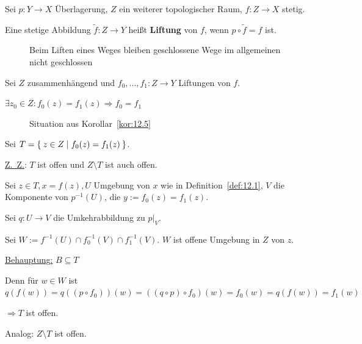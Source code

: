 \begin{definition}
    Sei $p: Y \rightarrow X$ Überlagerung, $Z$ ein weiterer topologischer
    Raum, $f:Z \rightarrow X$ stetig.

    Eine stetige Abbildung $\tilde{f}: Z \rightarrow Y$ heißt
    \textbf{Liftung} von $f$, wenn $p \circ \tilde{f} = f$ ist.
\end{definition}

\begin{figure}
    \centering
    
    \caption{Beim Liften eines Weges bleiben geschlossene Wege im allgemeinen nicht geschlossen}
    \label{fig:satz-seifert-van-kampen}
\end{figure}

\begin{korollar}\label{kor:12.5}%
    Sei $Z$ zusammenhängend und $f_0, \dots, f_1: Z \rightarrow Y$
    Liftungen von $f$.

    $\exists z_0 \in Z: f_0(z) = f_1(z) \Rightarrow f_0 = f_1$
\end{korollar}

\begin{figure}
    \centering
    
    \caption{Situation aus Korollar~\ref{kor:12.5}}
    \label{fig:situation-kor-12.5}
\end{figure}

\begin{beweis}
    Sei $T = \Set{z \in Z | f_0(z) = f_1(z)}$.

    \underline{Z.~Z.}: $T$ ist offen und $Z \setminus T$ ist auch offen.

    Sei $z \in T, x = f(z), U$ Umgebung von $x$ wie in Definition~\ref{def:12.1},
    $V$ die Komponente von $p^{-1}(U)$, die $y:=f_0(z) = f_1(z)$.

    Sei $q:U \rightarrow V$ die Umkehrabbildung zu $p|_V$.

    Sei $W:= f^{-1}(U) \cap f_0^{-1}(V) \cap f_1^{-1}(V)$. $W$ ist 
    offene Umgebung in $Z$ von $z$.

    \underline{Behauptung:} $B \subseteq T$

    Denn für $w \in W$ ist $q(f(w)) = q((p \circ f_0))(w) = ((q \circ p) \circ f_0) (w) = f_0(w) = q(f(w)) = f_1(w)$

    $\Rightarrow T$ ist offen.

    Analog: $Z \setminus T$ ist offen.
\end{beweis}

